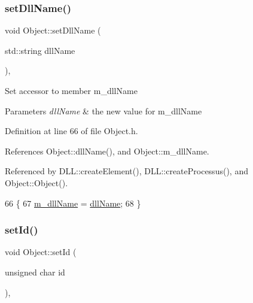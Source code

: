 \mbox{\label{classObject_a870c5af919958c2136623b2d7816d123}} 
\subsubsection{\texorpdfstring{set\+Dll\+Name()}{setDllName()}}
{\footnotesize\ttfamily void Object\+::set\+Dll\+Name (\begin{DoxyParamCaption}\item[{std\+::string}]{dll\+Name }\end{DoxyParamCaption})\hspace{0.3cm}{\ttfamily [inline]}, {\ttfamily [inherited]}}

Set accessor to member m\+\_\+dll\+Name 
\begin{DoxyParams}{Parameters}
{\em dll\+Name} & the new value for m\+\_\+dll\+Name \\
\hline
\end{DoxyParams}


Definition at line 66 of file Object.\+h.



References Object\+::dll\+Name(), and Object\+::m\+\_\+dll\+Name.



Referenced by D\+L\+L\+::create\+Element(), D\+L\+L\+::create\+Processus(), and Object\+::\+Object().


\begin{DoxyCode}
66                                       \{
67     \hyperlink{classObject_a01afbeacebb8db6831559972ec362eb3}{m\_dllName} = \hyperlink{classObject_a2e3947f2870094c332d7454117f3ec63}{dllName};
68   \}
\end{DoxyCode}
\mbox{\label{classObject_a398fe08cba594a0ce6891d59fe4f159f}} 
\subsubsection{\texorpdfstring{set\+Id()}{setId()}}
{\footnotesize\ttfamily void Object\+::set\+Id (\begin{DoxyParamCaption}\item[{unsigned char}]{id }\end{DoxyParamCaption})\hspace{0.3cm}{\ttfamily [inline]}, {\ttfamily [inherited]}}



